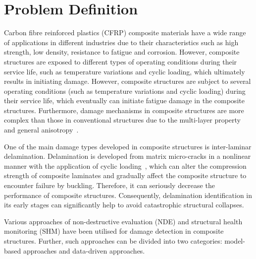 \section{Problem Definition}
\label{sec11}
Carbon fibre reinforced plastics (CFRP) composite materials have a wide range of applications in different industries due to their characteristics such as high strength, low density, resistance to fatigue and corrosion.
However, composite structures are exposed to different types of operating conditions during their service life, such as temperature variations and cyclic loading, which ultimately results in initiating damage. 
However, composite structures are subject to several operating conditions (such as temperature variations and cyclic loading) during their service life, which eventually can initiate fatigue damage in the composite structures.
Furthermore, damage mechanisms in composite structures are more complex than those in conventional structures due to the multi-layer property and general anisotropy~\cite{Wu2021}. 

One of the main damage types developed in composite structures is inter-laminar delamination.
Delamination is developed from matrix micro-cracks in a nonlinear manner with the application of cyclic loading~\cite{Reifsnider1983, Wu2021}, which can alter the compression strength of composite laminates and gradually affect the composite structure to encounter failure by buckling. Therefore, it can seriously decrease the performance of composite structures.
Consequently, delamination identification in its early stages can significantly help to avoid catastrophic structural collapses.

Various approaches of non-destructive evaluation (NDE) and structural health monitoring (SHM) have been utilised for damage detection in composite structures. 
Further, such approaches can be divided into two categories: model-based approaches and data-driven approaches.

